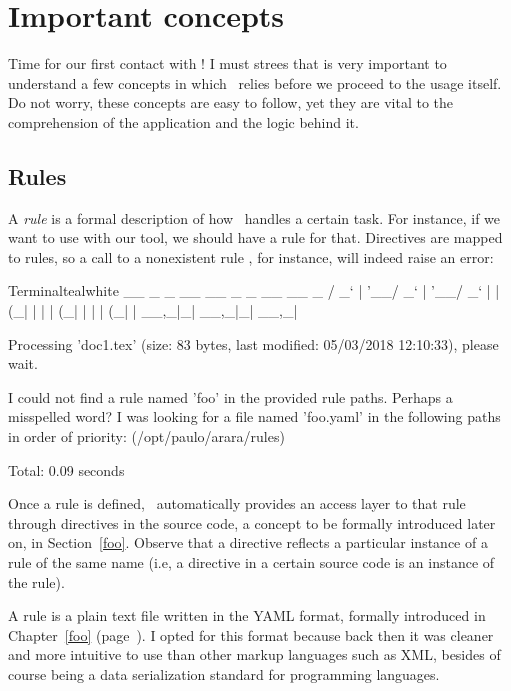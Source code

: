 \chapter{Important concepts}
\label{chap:importantconcepts}

Time for our first contact with \arara! I must strees that is very important to understand a few concepts in which \arara\ relies before we proceed to the usage itself. Do not worry, these concepts are easy to follow, yet they are vital to the comprehension of the application and the logic behind it.

\section{Rules}
\label{sec:rule}

A \emph{rule} is a formal description of how \arara\ handles a certain task. For instance, if we want to use  with our tool, we should have a rule for that. Directives are mapped to rules, so a call to a nonexistent rule , for instance, will indeed raise an error:

\begin{codebox}{Terminal}{teal}{\icnote}{white}
  __ _ _ __ __ _ _ __ __ _ 
 / _` | '__/ _` | '__/ _` |
| (_| | | | (_| | | | (_| |
 \__,_|_|  \__,_|_|  \__,_|

Processing 'doc1.tex' (size: 83 bytes, last modified: 05/03/2018
12:10:33), please wait.

I could not find a rule named 'foo' in the provided rule paths.
Perhaps a misspelled word? I was looking for a file named
'foo.yaml' in the following paths in order of priority:
(/opt/paulo/arara/rules)

Total: 0.09 seconds
\end{codebox}

Once a rule is defined, \arara\ automatically provides an access layer to that rule through directives in the source code, a concept to be formally introduced later on, in Section~\ref{foo}. Observe that a directive reflects a particular instance of a rule of the same name (i.e, a  directive in a certain source code is an instance of the  rule).

A rule is a plain text file written in the YAML format, formally introduced in Chapter~\ref{foo} (page~\pageref{foo}). I opted for this format because back then it was cleaner and more intuitive to use than other markup languages such as XML, besides of course being a data serialization standard for programming languages.


